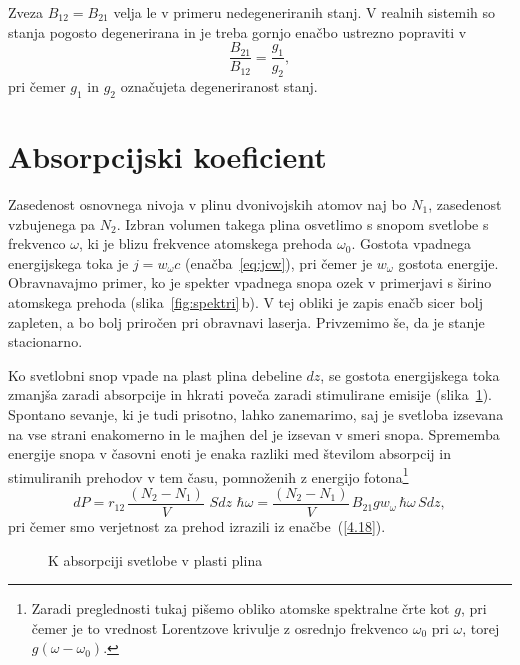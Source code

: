 \begin{remark}
 Zveza $B_{12}=B_{21}$ velja le v primeru nedegeneriranih stanj. V realnih sistemih
 so stanja pogosto degenerirana in je treba gornjo enačbo ustrezno popraviti v
\begin{equation}
\frac{B_{21}}{B_{12}} = \frac{g_1}{g_2},
\label{eq:ABdeg}
\end{equation}
pri čemer $g_{1}$ in $g_2$ označujeta degeneriranost stanj. 
\end{remark}

\section{Absorpcijski koeficient}
Zasedenost osnovnega nivoja v plinu dvonivojskih atomov naj bo $N_1$, zasedenost vzbujenega
pa $N_2$. Izbran volumen takega plina osvetlimo s snopom svetlobe s frekvenco
$\omega$, ki je blizu frekvence atomskega prehoda $\omega_{0}$. Gostota
vpadnega energijskega toka je $j=w_{\omega}c$ (enačba~\ref{eq:jcw}), 
pri čemer je $w_{\omega}$ gostota energije. Obravnavajmo primer, ko je 
spekter vpadnega snopa ozek v primerjavi s širino atomskega prehoda
(slika~\ref{fig:spektri}\,b). V tej obliki je zapis enačb sicer bolj zapleten,
a bo bolj priročen pri obravnavi laserja. Privzemimo še, da
je stanje stacionarno. 

Ko svetlobni snop vpade na plast plina debeline $dz$, se gostota
energijskega toka zmanjša zaradi absorpcije in hkrati poveča zaradi 
stimulirane emisije (slika~\ref{fig:abs}). 
Spontano sevanje, ki je tudi prisotno, lahko zanemarimo, saj
je svetloba izsevana na vse strani enakomerno in le majhen del je izsevan v smeri snopa.
Sprememba energije snopa v časovni enoti je enaka razliki med 
številom absorpcij in stimuliranih prehodov v tem času, pomnoženih z 
energijo fotona\footnote{Zaradi preglednosti tukaj pišemo obliko atomske spektralne črte kot $g$, 
pri čemer je to vrednost Lorentzove krivulje z osrednjo frekvenco $\omega_0$ pri $\omega$, 
torej $g(\omega-\omega_0)$.}
\begin{equation}
dP=r_{12}\,\frac{(N_{2}-N_{1})}{V}\,\,S dz\, \, \hbar\omega = 
\frac{(N_{2}-N_{1})}{V}\,B_{21}g w_{\omega} \, \hbar\omega \,S dz,
\label{4.28}
\end{equation}
pri čemer smo verjetnost za prehod izrazili iz 
enačbe~(\ref{4.18}).
\begin{figure}[h]
\centering
\def\svgwidth{70truemm} 

\caption{K absorpciji svetlobe v plasti plina}
\label{fig:abs}
\end{figure}

